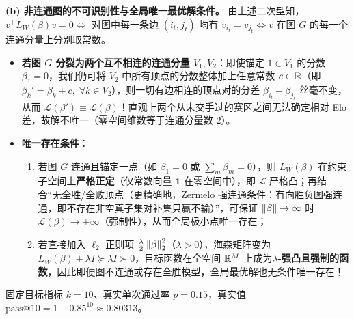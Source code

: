 \textbf{(b) 非连通图的不可识别性与全局唯一最优解条件。}
由上述二次型知，$v^\top L_W(\beta) v = 0 \iff$ 对图中每一条边 $(i_t, j_t)$ 均有 $v_{i_t} = v_{j_t} \iff v$ 在图 $G$ 的每一个连通分量上分别取常数。
\begin{itemize}
  \item \textbf{若图 $G$ 分裂为两个互不相连的连通分量 $V_1, V_2$}：即使锚定 $1 \in V_1$ 的分数 $\beta_1 = 0$，我们仍可将 $V_2$ 中所有顶点的分数整体加上任意常数 $c \in \mathbb{R}$（即 $\beta_k' = \beta_k + c,\; \forall k \in V_2$），则一切有边相连的顶点对的分差 $\beta_{i_t} - \beta_{j_t}$ 丝毫不变，从而 $\mathcal{L}(\beta') \equiv \mathcal{L}(\beta)$！直观上两个从未交手过的赛区之间无法确定相对 Elo 差，故解不唯一（零空间维数等于连通分量数 $2$）。
  \item \textbf{唯一存在条件}：
  \begin{enumerate}
    \item 若图 $G$ 连通且锚定一点（如 $\beta_1 = 0$ 或 $\sum_m \beta_m = 0$），则 $L_W(\beta)$ 在约束子空间上\textbf{严格正定}（仅常数向量 $\mathbf{1}$ 在零空间中），即 $\mathcal{L}$ 严格凸；再结合“无全胜/全败顶点（更精确地，Zermelo 强连通条件：有向胜负图强连通，即不存在非空真子集对补集只赢不输）”，可保证 $\left\|\beta\right\| \to \infty$ 时 $\mathcal{L}(\beta) \to +\infty$（强制性），从而全局极小点唯一存在；
    \item 若直接加入 $\ell_2$ 正则项 $\frac{\lambda}{2}\left\|\beta\right\|_2^2$（$\lambda > 0$），海森矩阵变为 $L_W(\beta) + \lambda I \succeq \lambda I \succ 0$，目标函数在全空间 $\mathbb{R}^M$ 上成为\textbf{$\lambda$-强凸且强制的函数}，因此即便图不连通或存在全胜模型，全局最优解也无条件唯一存在！
  \end{enumerate}
\end{itemize}


固定目标指标 $k = 10$、真实单次通过率 $p = 0.15$，真实值 $\mathrm{pass@}10 = 1 - 0.85^{10} \approx \mathbf{0.80313}$。

